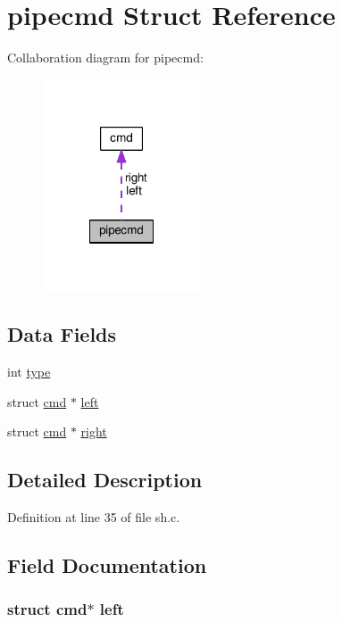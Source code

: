 \hypertarget{structpipecmd}{\section{pipecmd Struct Reference}
\label{structpipecmd}
}


Collaboration diagram for pipecmd\-:
\nopagebreak
\begin{figure}[H]
\begin{center}
\leavevmode
\includegraphics[width=132pt]{structpipecmd__coll__graph}
\end{center}
\end{figure}
\subsection*{Data Fields}
\begin{DoxyCompactItemize}
\item 
int \hyperlink{structpipecmd_ac765329451135abec74c45e1897abf26}{type}
\item 
struct \hyperlink{structcmd}{cmd} $\ast$ \hyperlink{structpipecmd_a69f2fa418c6e61f8b6b4e44f12a3ab4b}{left}
\item 
struct \hyperlink{structcmd}{cmd} $\ast$ \hyperlink{structpipecmd_ab5429c86b9ebd1279ea5674110a2190b}{right}
\end{DoxyCompactItemize}


\subsection{Detailed Description}


Definition at line 35 of file sh.\-c.



\subsection{Field Documentation}
\hypertarget{structpipecmd_a69f2fa418c6e61f8b6b4e44f12a3ab4b}{
\subsubsection[{left}]{\setlength{\rightskip}{0pt plus 5cm}struct {\bf cmd}$\ast$ left}}\label{structpipecmd_a69f2fa418c6e61f8b6b4e44f12a3ab4b}


